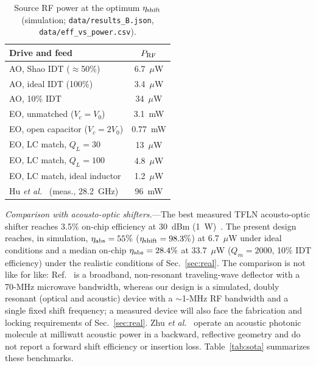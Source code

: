 \documentclass[aps,prapplied,reprint,superscriptaddress,amsmath,amssymb,floatfix]{revtex4-2}
\newcommand{\etash}{\eta_{\rm shift}}
\newcommand{\etaabs}{\eta_{\rm abs}}
\newcommand{\Pg}{P_{\rm RF}}
\begin{document}
\begin{table}[t]
\caption{Source RF power at the optimum $\etash$ (simulation; \texttt{data/results\_B.json}, \texttt{data/eff\_vs\_power.csv}).}
\label{tab:power}
\begin{ruledtabular}
\begin{tabular}{lc}
Drive and feed & $\Pg$\\
\hline
AO, Shao IDT ($\approx$50\%) & 6.7~$\mu$W\\
AO, ideal IDT (100\%) & 3.4~$\mu$W\\
AO, 10\% IDT & 34~$\mu$W\\
EO, unmatched ($V_c=V_0$) & 3.1~mW\\
EO, open capacitor ($V_c=2V_0$) & 0.77~mW\\
EO, LC match, $Q_L=30$ & 13~$\mu$W\\
EO, LC match, $Q_L=100$ & 4.8~$\mu$W\\
EO, LC match, ideal inductor & 1.2~$\mu$W\\
\hline
Hu \emph{et al.}~\cite{Hu2021} (meas., 28.2~GHz) & 96~mW\\
\end{tabular}
\end{ruledtabular}
\end{table}

\emph{Comparison with acousto-optic shifters.}---The best measured TFLN acousto-optic shifter reaches 3.5\% on-chip efficiency at 30~dBm (1~W)~\cite{Shao2020}. The present design reaches, in simulation, $\etaabs=55\%$ ($\etash=98.3\%$) at 6.7~$\mu$W under ideal conditions and a median on-chip $\etaabs=28.4\%$ at 33.7~$\mu$W ($Q_m=2000$, 10\% IDT efficiency) under the realistic conditions of Sec.~\ref{sec:real}. The comparison is not like for like: Ref.~\cite{Shao2020} is a broadband, non-resonant traveling-wave deflector with a 70-MHz microwave bandwidth, whereas our design is a simulated, doubly resonant (optical and acoustic) device with a $\sim$1-MHz RF bandwidth and a single fixed shift frequency; a measured device will also face the fabrication and locking requirements of Sec.~\ref{sec:real}. Zhu \emph{et al.}~\cite{Zhu2025ao} operate an acoustic photonic molecule at milliwatt acoustic power in a backward, reflective geometry and do not report a forward shift efficiency or insertion loss. Table~\ref{tab:sota} summarizes these benchmarks.
\end{document}
